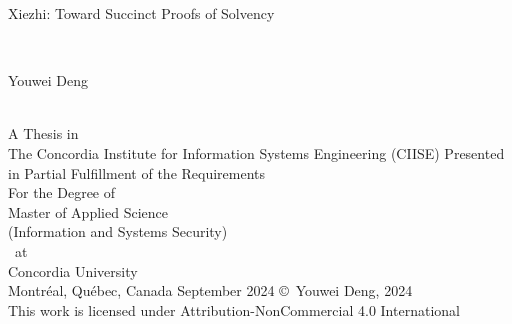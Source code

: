 
\thispagestyle{empty} %

\begin{center} 
\begin{Large} Xiezhi: Toward Succinct Proofs of Solvency \end{Large}\\[3em]
\begin{large} Youwei Deng \end{large}\\
\vfill
A Thesis in\\
The Concordia Institute for Information Systems Engineering (CIISE)
\vfill
Presented in Partial Fulfillment of the Requirements\\
For the Degree of\\
Master of Applied Science \\ 
(Information and Systems Security)\\~at\\
Concordia University\\
Montr\'{e}al, Qu\'{e}bec, Canada
\vfill
September 2024
\vfill
\copyright~Youwei Deng, 2024\\
This work is licensed under Attribution-NonCommercial 4.0 International
\end{center}

